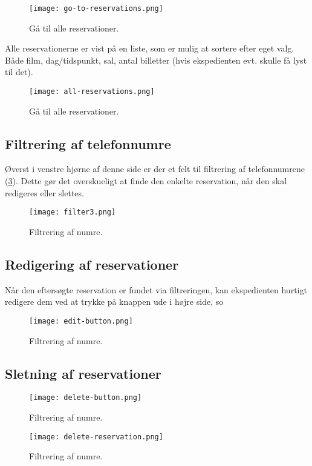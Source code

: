 \begin{figure} [h]
  \centering
  \texttt{[image: go-to-reservations.png]}
  \caption{Gå til alle reservationer.}
  \label{screenshot: go-to-reservations}
\end{figure}

Alle reservationerne er vist på en liste, som er mulig at sortere efter eget valg. Både film, dag/tidspunkt, sal, antal billetter (hvis ekspedienten evt. skulle få lyst til det). 

\begin{figure} [h]
  \centering
  \texttt{[image: all-reservations.png]}
  \caption{Gå til alle reservationer.}
  \label{screenshot: all-reservations}
\end{figure}

\subsection{Filtrering af telefonnumre}

Øverst i venstre hjørne af denne side er der et felt til filtrering af telefonnumrene (\ref{screenshot: filter3}). Dette gør det overskueligt at finde den enkelte reservation, når den skal redigeres eller slettes. 

\begin{figure} [h]
  \centering
  \texttt{[image: filter3.png]}
  \caption{Filtrering af numre.}
  \label{screenshot: filter3}
\end{figure}

\subsection{Redigering af reservationer}

Når den eftersøgte reservation er fundet via filtreringen, kan ekspedienten hurtigt redigere dem ved at trykke på knappen ude i højre side, so

\begin{figure} [h]
  \centering
  \texttt{[image: edit-button.png]}
  \caption{Filtrering af numre.}
  \label{screenshot: edit-button}
\end{figure}

\subsection{Sletning af reservationer}

\begin{figure} [h]
  \centering
  \texttt{[image: delete-button.png]}
  \caption{Filtrering af numre.}
  \label{screenshot: delete-button}
\end{figure}

\begin{figure} [h]
  \centering
  \texttt{[image: delete-reservation.png]}
  \caption{Filtrering af numre.}
  \label{screenshot: delete-reservation}
\end{figure}